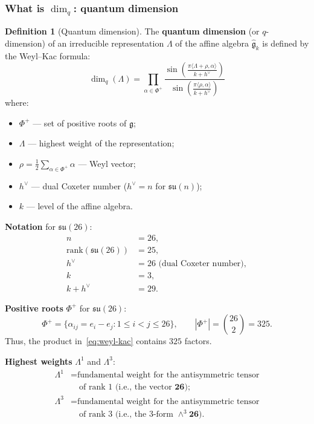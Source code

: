 \documentclass[11pt,a4paper]{article}
\theoremstyle{definition}
\newtheorem{definition}[theorem]{Definition}
\begin{document}
\subsubsection{What is \texorpdfstring{$\dim_q$}{\_q}: quantum dimension}

\begin{definition}[Quantum dimension]
\label{def:dim-q}
The \textbf{quantum dimension} (or $q$-dimension) of an irreducible
representation $\Lambda$ of the affine algebra $\hat{\mathfrak{g}}_k$
is defined by the Weyl--Kac formula:
\begin{equation}
    \boxed{
    \dim_q(\Lambda) =
    \prod_{\alpha \in \Phi^+}
    \frac{\sin\left( \frac{\pi \langle \Lambda + \rho, \alpha \rangle}{k + h^\vee} \right)}
         {\sin\left( \frac{\pi \langle \rho, \alpha \rangle}{k + h^\vee} \right)}
    }
    \label{eq:weyl-kac}
\end{equation}
where:
\begin{itemize}
    \item $\Phi^+$ --- set of positive roots of $\mathfrak{g}$;
    \item $\Lambda$ --- highest weight of the representation;
    \item $\rho = \frac{1}{2} \sum_{\alpha \in \Phi^+} \alpha$ --- Weyl vector;
    \item $h^\vee$ --- dual Coxeter number ($h^\vee = n$ for $\mathfrak{su}(n)$);
    \item $k$ --- level of the affine algebra.
\end{itemize}
\end{definition}

\medskip\noindent
\textbf{Notation} for $\mathfrak{su}(26)$:
\begin{align}
    n &= 26, \\
    \text{rank}(\mathfrak{su}(26)) &= 25, \\
    h^\vee &= 26 \text{ (dual Coxeter number)}, \\
    k &= 3, \\
    k + h^\vee &= 29.
\end{align}

\medskip\noindent
\textbf{Positive roots} $\Phi^+$ for $\mathfrak{su}(26)$:
\begin{equation}
    \Phi^+ = \{\alpha_{ij} = e_i - e_j : 1 \le i < j \le 26\},
    \qquad |\Phi^+| = \binom{26}{2} = 325.
\end{equation}
Thus, the product in~\eqref{eq:weyl-kac} contains $325$ factors.

\medskip\noindent
\textbf{Highest weights} $\Lambda^1$ and $\Lambda^3$:
\begin{align}
    \Lambda^1 &= \text{fundamental weight for the antisymmetric tensor} \\
    &\quad \text{of rank 1 (i.e., the vector $\mathbf{26}$)}; \\
    \Lambda^3 &= \text{fundamental weight for the antisymmetric tensor} \\
    &\quad \text{of rank 3 (i.e., the 3-form $\wedge^3 \mathbf{26}$)}.
\end{align}
\end{document}

